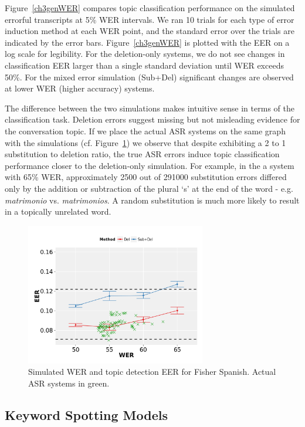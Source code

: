 Figure~\ref{ch3genWER} compares topic classification performance on the simulated errorful transcripts at 5\% WER intervals.  We ran 10 trials for each type of error induction method at each WER point, and the standard error over the trials are indicated by the error bars.  Figure~\ref{ch3genWER} is plotted with the EER on a log scale for legibility.   For the deletion-only systems, we do not see changes in classification EER larger than a single standard deviation until WER exceeds 50\%.  For the mixed error simulation (Sub+Del) significant changes are observed at lower WER (higher accuracy) systems.

The difference between the two simulations makes intuitive sense in terms of the classification task.  Deletion errors suggest missing but not misleading evidence for the conversation topic.  If we place the actual ASR systems on the same graph with the simulations (cf. Figure~\ref{ch3genWERzoom}) we observe that despite exhibiting a 2 to 1 substitution to deletion ratio, the true ASR errors induce topic classification performance closer to the deletion-only simulation.  For example, in the a system with 65\% WER, approximately 2500 out of 291000 substitution errors differed only by the addition or subtraction of the plural `s' at the end of the word - e.g. \textit{matrimonio} vs. \textit{matrimonios}.   A random substitution is much more likely to result in a topically unrelated word.

\begin{figure}
\centering
\includegraphics[width=0.7\textwidth]{graphs/ch3/gen-wer-zoom.png}
\caption[Simulated WER and Fisher Spanish EER]{Simulated WER and topic detection EER for Fisher Spanish.  Actual ASR systems in green.\label{ch3genWERzoom}}
\end{figure}


\subsection{Keyword Spotting Models}

